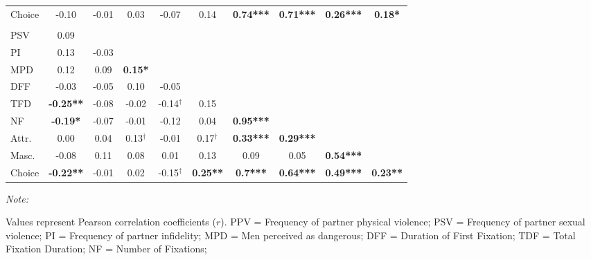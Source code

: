 \documentclass[
  bookmarksnumbered]{article}
\begin{document}
\begin{table}[H]
{\begin{threeparttable}
\begin{tabular}[t]{lccccccccc}
\hspace{1em}Choice & -0.10 & -0.01 & 0.03 & -0.07 & 0.14 & \textbf{0.74***} & \textbf{0.71***} & \textbf{0.26***} & \textbf{0.18*}\\
\addlinespace[0.3em]
\hline
\multicolumn{10}{l}{\textbf{High condition, long-term relationship}}\\
\hline
\hspace{1em}PSV & 0.09 &  &  &  &  &  &  &  & \\
\hspace{1em}PI & 0.13 & -0.03 &  &  &  &  &  &  & \\
\hspace{1em}MPD & 0.12 & 0.09 & \textbf{0.15*} &  &  &  &  &  & \\
\hspace{1em}DFF & -0.03 & -0.05 & 0.10 & -0.05 &  &  &  &  & \\
\hspace{1em}TFD & \textbf{-0.25**} & -0.08 & -0.02 & -0.14$^{\dagger}$ & 0.15 &  &  &  & \\
\hspace{1em}NF & \textbf{-0.19*} & -0.07 & -0.01 & -0.12 & 0.04 & \textbf{0.95***} &  &  & \\
\hspace{1em}Attr. & 0.00 & 0.04 & 0.13$^{\dagger}$ & -0.01 & 0.17$^{\dagger}$ & \textbf{0.33***} & \textbf{0.29***} &  & \\
\hspace{1em}Masc. & -0.08 & 0.11 & 0.08 & 0.01 & 0.13 & 0.09 & 0.05 & \textbf{0.54***} & \\
\hspace{1em}Choice & \textbf{-0.22**} & -0.01 & 0.02 & -0.15$^{\dagger}$ & \textbf{0.25**} & \textbf{0.7***} & \textbf{0.64***} & \textbf{0.49***} & \textbf{0.23**}\\
\bottomrule
\end{tabular}
\begin{tablenotes}[para]
\item \textit{Note: } 
\item Values represent Pearson correlation coefficients ($r$). PPV = Frequency of partner physical violence; 
                            PSV = Frequency of partner sexual violence;
                            PI =  Frequency of partner infidelity; 
                            MPD = Men perceived as dangerous;
                            DFF = Duration of First Fixation; 
                            TDF = Total Fixation Duration; 
                            NF = Number of Fixations; 

\end{tablenotes}
\end{threeparttable}}
\end{table}
\end{document}
